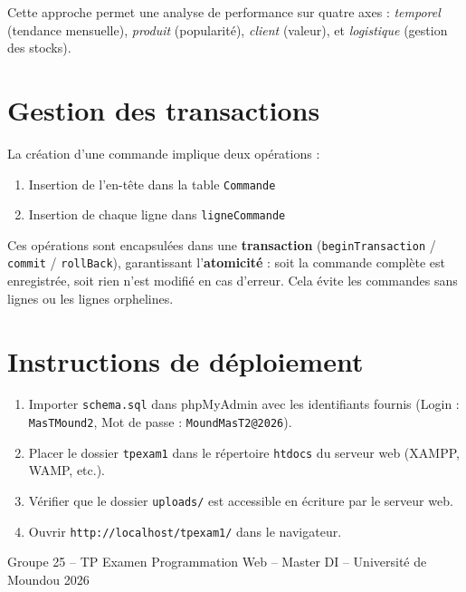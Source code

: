 \documentclass[11pt,a4paper]{article}
\begin{document}
Cette approche permet une analyse de performance sur quatre axes : \textit{temporel} (tendance mensuelle), \textit{produit} (popularit\'e), \textit{client} (valeur), et \textit{logistique} (gestion des stocks).


\section{Gestion des transactions}

La cr\'eation d'une commande implique deux op\'erations :
\begin{enumerate}
  \item Insertion de l'en-t\^ete dans la table \texttt{Commande}
  \item Insertion de chaque ligne dans \texttt{ligneCommande}
\end{enumerate}

Ces op\'erations sont encapsul\'ees dans une \textbf{transaction} (\texttt{beginTransaction} / \texttt{commit} / \texttt{rollBack}), garantissant l'\textbf{atomicit\'e} : soit la commande compl\`ete est enregistr\'ee, soit rien n'est modifi\'e en cas d'erreur. Cela \'evite les commandes sans lignes ou les lignes orphelines.


\section{Instructions de d\'eploiement}

\begin{enumerate}
  \item Importer \texttt{schema.sql} dans phpMyAdmin avec les identifiants fournis (Login : \texttt{MasTMound2}, Mot de passe : \texttt{MoundMasT2@2026}).
  \item Placer le dossier \texttt{tpexam1} dans le r\'epertoire \texttt{htdocs} du serveur web (XAMPP, WAMP, etc.).
  \item V\'erifier que le dossier \texttt{uploads/} est accessible en \'ecriture par le serveur web.
  \item Ouvrir \texttt{http://localhost/tpexam1/} dans le navigateur.
\end{enumerate}

\vfill
\begin{center}
\small\color{gray}
Groupe 25 -- TP Examen Programmation Web -- Master DI -- Universit\'e de Moundou 2026
\end{center}
\end{document}
